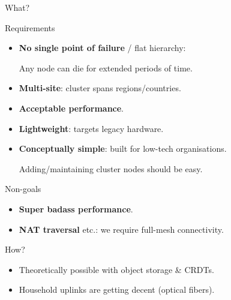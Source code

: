 \begin{frame}{What?}


\begin{block}{Requirements}
\begin{itemize}
	\item \textbf{No single point of failure} / flat hierarchy: 

	Any node can die for extended periods of time.
	\item \textbf{Multi-site}: cluster spans regions/countries.
	\item \textbf{Acceptable performance}.
	\item \textbf{Lightweight}: targets legacy hardware.
	\item \textbf{Conceptually simple}: built for low-tech organisations.

	Adding/maintaining cluster nodes should be easy.
\end{itemize}
\end{block}
\vfill 

\begin{block}{Non-goals}
\begin{itemize}
	\item \textbf{Super badass performance}.
	\item \textbf{NAT traversal} etc.: we require full-mesh connectivity.
\end{itemize}
\end{block}
\end{frame}


\begin{frame}{How?}

\begin{itemize}
	\item Theoretically possible with object storage \& CRDTs.
	\vfill
	\item Household uplinks are getting decent (optical fibers).
\end{itemize}



\end{frame}

